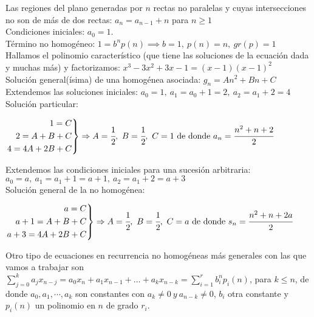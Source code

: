 \begin{ejemplo} Las regiones del plano generadas por $n$ rectas no paralelas y cuyas intersecciones no son de más de dos rectas:
    $a_{n} = a_{n-1} + n$ para $n \geq 1$ \\
    Condiciones iniciales: $a_{0} = 1$.\\
    Término no homogéneo: $1 = b^np(n) \implies b = 1, \ p(n) = n, \ gr(p) = 1$ \\
    Hallamos el polinomio característico (que tiene las soluciones de la ecuación dada y muchas más) y factorizamos: $x^3 -3x^2 +3x -1 = (x-1)(x-1)^2$\\
    Solución general(ísima) de una homogénea asociada: $g_{n} = An^2 + Bn + C$ \\
    Extendemos las soluciones iniciales: $a_0 = 1, \ a_1 = a_0 +1 = 2, \ a_2 = a_1 +2 = 4$ \\
    Solución particular:
    \begin{center}
        $\left.
            \begin{aligned}
                1 = C         \\
                2 = A + B + C \\
                4 = 4A + 2B + C
            \end{aligned} \right \}
            \Rightarrow A = \cfrac{1}{2}, \ B = \cfrac{1}{2}, \ C = 1 \text{ de donde } a_n = \cfrac{n^2+n+2}{2}$
    \end{center}
    Extendemos las condiciones iniciales para una sucesión arbitraria: $a_0 = a, \ a_1 = a_1 + 1 = a + 1, \ a_2 = a_1 + 2 = a + 3$ \\
    Solución general  de la no homogénea:
    \begin{center}
        $\left.
            \begin{aligned}
                a = C             \\
                a + 1 = A + B + C \\
                a + 3 = 4A + 2B + C
            \end{aligned} \right \}
            \Rightarrow A = \cfrac{1}{2}, \ B = \cfrac{1}{2}, \ C = a \text{ de donde } s_n = \cfrac{n^2+n+2a}{2}$
    \end{center}
\end{ejemplo}
\smallskip

Otro tipo de ecuaciones en recurrencia no homogéneas más generales con las que vamos a trabajar son $\sum_{j=0}^k a_jx_{n-j} = a_0x_n + a_1x_{n-1} + \ldots + a_kx_{n-k} = \sum_{i=1}^r b_i^np_i(n)$, para $k \leq n$,
de donde $a_0, a_1, \cdots, a_k$ son constantes con $a_k \neq 0 \ y \ a_{n-k} \neq 0$, $b_i$ otra constante y $p_i(n)$ un polinomio en $n$ de grado $r_i$.

